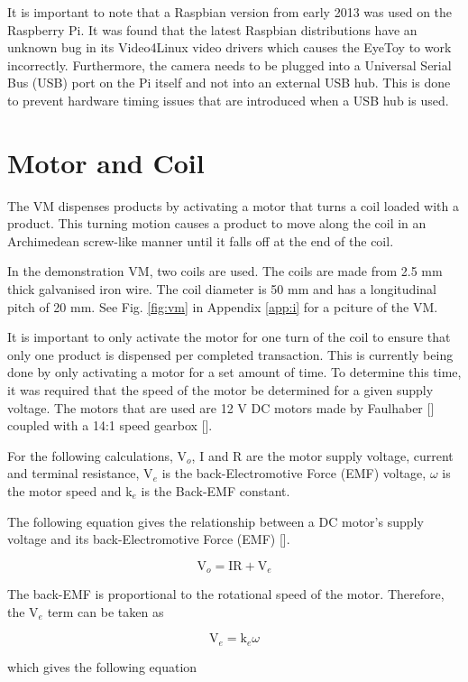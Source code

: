 It is important to note that a Raspbian version from early 2013 was used on the
Raspberry Pi. It was found that the latest Raspbian distributions have an
unknown bug in its Video4Linux video drivers which causes the EyeToy to
work incorrectly. Furthermore, the camera needs to be plugged into a Universal Serial Bus
(USB) port on the Pi itself and not into an external USB hub. This is done to prevent
hardware timing issues that are introduced when a USB hub is used.

\section{Motor and Coil}

The VM dispenses products by activating a motor that turns a coil
loaded with a product. This turning motion causes a product to move along the
coil in an Archimedean screw-like manner until it falls off at the end of the
coil. 

In the demonstration VM, two coils are used. The coils are made
from 2.5 mm thick galvanised iron wire. The coil diameter is 50 mm and has a
longitudinal pitch of 20 mm. See Fig. \ref{fig:vm} in Appendix \ref{app:i} for a
pciture of the VM.

It is important to only activate the motor for one turn of the coil to
ensure that only one product is dispensed per completed transaction. This is
currently being done by only activating a motor for a set amount of time. To
determine this time, it was required that the speed of the motor be
determined for a given supply voltage. The motors that are used are 12 V DC motors made
by Faulhaber [\cite{manual:dc-motors}] coupled with a 14:1 speed gearbox
[\cite{manual:gearbox}].

For the following calculations, V$_o$, I and R are the motor supply voltage, current and
terminal resistance, V$_e$ is the back-Electromotive Force (EMF) voltage, $\omega$ is
the motor speed and k$_e$ is the Back-EMF constant.

The following equation gives the relationship between a DC motor's supply
voltage and its back-Electromotive Force (EMF) [\cite{article:motor-calc}].

\[ \mathrm{V}_o = \mathrm{IR} + \mathrm{V}_e\]

The back-EMF is proportional to the rotational speed of the motor. Therefore,
the V$_e$ term can be taken as

\[ \mathrm{V}_e = \mathrm{k}_e\omega\]

which gives the following equation

